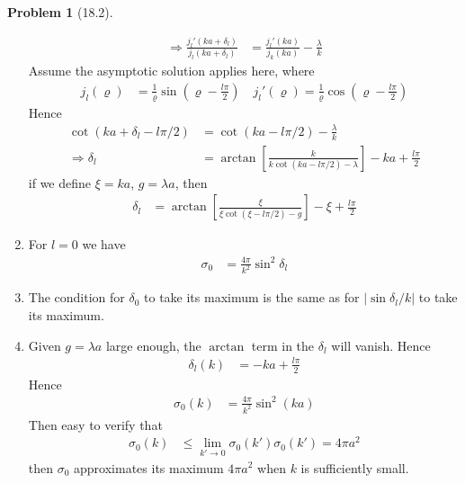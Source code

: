 \documentclass[twoside,11pt]{article}
\theoremstyle{definition}
\newtheorem{problem}{Problem}
\theoremstyle{remark}
\begin{document}
\begin{problem}[18.2]
\begin{enumerate}[label=(\alph*)]
\begin{align*}
    \Rightarrow
    \frac{j_l'(ka+\delta_l)}{j_l(ka+\delta_l)} &= 
    \frac{j_l'(ka)}{j_k(ka)} - \frac{\lambda}{k}
\end{align*}
Assume the asymptotic solution applies here, where
\begin{align*}
    j_l(\varrho) &= \frac{1}{\varrho}\sin\left(\varrho - \frac{l\pi}{2}\right)\quad
    j_l'(\varrho) = \frac{1}{\varrho}\cos\left(\varrho - \frac{l\pi}{2}\right)
\end{align*}
Hence 
\begin{align*}
    \cot (ka+\delta_l-l\pi/2) &= 
    \cot (ka-l\pi/2) - \frac{\lambda}{k}\\
    \Rightarrow
    \delta_l &= \arctan\left[\frac{k}{k\cot (ka-l\pi/2) - \lambda}\right] 
    - ka + \frac{l\pi}{2}
\end{align*}
if we define $\xi=ka$, $g=\lambda a$, then
\begin{align*}
    \delta_l &= \arctan\left[\frac{\xi}{\xi\cot (\xi-l\pi/2) - g}\right] 
    - \xi + \frac{l\pi}{2}
\end{align*}

\item For $l=0$ we have
\begin{align*}
    \sigma_0 &= 
    \frac{4\pi}{k^2}\sin^2\delta_l
\end{align*}

\item The condition for $\delta_0$ to take its maximum is the same as
for $|\sin\delta_l/k|$ to take its maximum.

\item Given $g=\lambda a$ large enough, the $\arctan$ term in the
$\delta_l$ will vanish. Hence 
\begin{align*}
    \delta_l(k) &= -ka + \frac{l\pi}{2}
\end{align*}
Hence 
\begin{align*}
    \sigma_0(k) &= \frac{4\pi}{k^2}\sin^2(ka)
\end{align*}
Then easy to verify that
\begin{align*}
    \sigma_0(k) &\leq \lim_{k'\rightarrow 0}\sigma_0(k')
    \sigma_0(k') = 4\pi a^2
\end{align*}
then $\sigma_0$ approximates its maximum $4\pi a^2$ when $k$ is sufficiently small.

\end{enumerate}
\end{problem}
\end{document}
